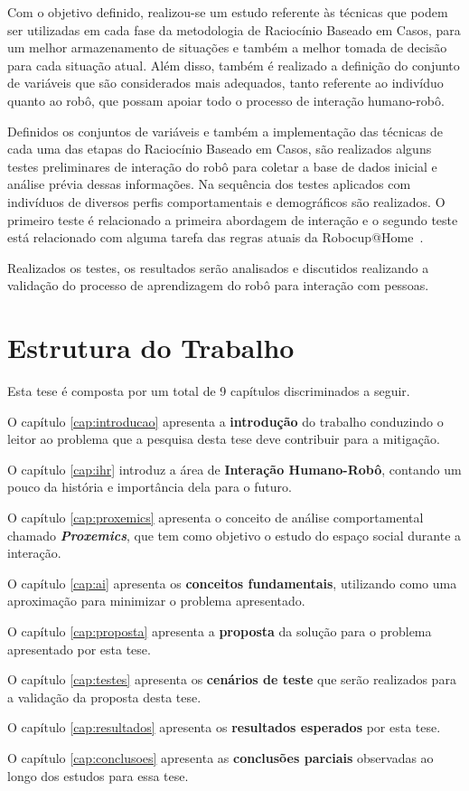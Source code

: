 Com o objetivo definido, realizou-se um estudo referente às técnicas que podem ser utilizadas em cada fase da metodologia de Raciocínio Baseado em Casos, para um melhor armazenamento de situações e também a melhor tomada de decisão para cada situação atual. Além disso, também é realizado a definição do conjunto de variáveis que são considerados mais adequados, tanto referente ao indivíduo quanto ao robô, que possam apoiar todo o processo de interação humano-robô.

Definidos os conjuntos de variáveis e também a implementação das técnicas de cada uma das etapas do Raciocínio Baseado em Casos, são realizados alguns testes preliminares de interação do robô para coletar a base de dados inicial e análise prévia dessas informações. Na sequência dos testes aplicados com indivíduos de diversos perfis comportamentais e demográficos são realizados. O primeiro teste é relacionado a primeira abordagem de interação e o segundo teste está relacionado com alguma tarefa das regras atuais da Robocup@Home~\cite{robocup:2015}.

Realizados os testes, os resultados serão analisados e discutidos realizando a validação do processo de aprendizagem do robô para interação com pessoas.

\section{Estrutura do Trabalho}
Esta tese é composta por um total de 9 capítulos discriminados a seguir.

O capítulo \ref{cap:introducao} apresenta a \textbf{introdução} do trabalho conduzindo o leitor ao problema que a pesquisa desta tese deve contribuir para a mitigação.

O capítulo \ref{cap:ihr} introduz a área de \textbf{Interação Humano-Robô}, contando um pouco da história e importância dela para o futuro.

O capítulo \ref{cap:proxemics} apresenta o conceito de análise comportamental chamado \emph{\textbf{Proxemics}}, que tem como objetivo o estudo do espaço social durante a interação.

O capítulo \ref{cap:ai} apresenta os \textbf{conceitos fundamentais}, utilizando como uma aproximação para minimizar o problema apresentado.

O capítulo \ref{cap:proposta} apresenta a \textbf{proposta} da solução para o problema apresentado por esta tese.

O capítulo \ref{cap:testes} apresenta os \textbf{cenários de teste} que serão realizados para a validação da proposta desta tese.

O capítulo \ref{cap:resultados} apresenta os \textbf{resultados esperados} por esta tese.

O capítulo \ref{cap:conclusoes} apresenta as \textbf{conclusões parciais} observadas ao longo dos estudos para essa tese.
